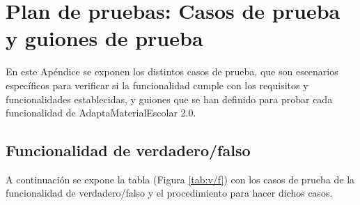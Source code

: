 \chapter{Plan de pruebas: Casos de prueba y guiones de prueba}\label{ape:pruebas}

En este Apéndice se exponen los distintos casos de prueba,  que son escenarios específicos para verificar si la funcionalidad cumple con los requisitos y funcionalidades establecidas, y guiones que se han definido para probar cada funcionalidad de AdaptaMaterialEscolar 2.0.

\section{Funcionalidad de verdadero/falso}
\label{planPruebas:v/f}
A continuación se expone la tabla (Figura \ref{tab:v/f}) con los casos de prueba de la funcionalidad de verdadero/falso y el procedimiento para hacer dichos casos.

